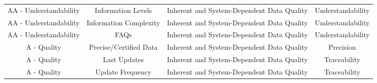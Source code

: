 \documentclass[a4paper, twoside]{report}
\begin{document}
\begin{table}[htbp]
\begin{adjustbox}{max width=\linewidth}
\begin{tabular}{cc|cc}
    \rowcolor[rgb]{ .851,  .851,  .851} AA - Understandability & Information Levels & Inherent and System-Dependent Data Quality & Understandability \\
    \rowcolor[rgb]{ .851,  .851,  .851} AA - Understandability & Information Complexity & Inherent and System-Dependent Data Quality & Understandability \\
    \rowcolor[rgb]{ .851,  .851,  .851} AA - Understandability & FAQs  & Inherent and System-Dependent Data Quality & Understandability \\
    A - Quality & Precise/Certified Data & Inherent and System-Dependent Data Quality & Precision \\
    \rowcolor[rgb]{ .851,  .851,  .851} A - Quality & Last Updates & Inherent and System-Dependent Data Quality & Traceability \\
    \rowcolor[rgb]{ .851,  .851,  .851} A - Quality & Update Frequency & Inherent and System-Dependent Data Quality & Traceability \\
    \bottomrule
    \end{tabular}%
    \end{adjustbox}
  \label{tab:compatibility1}%
\end{table}%
\end{document}
